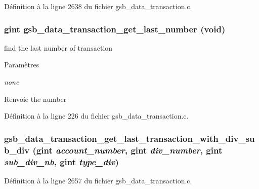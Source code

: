 Définition à la ligne 2638 du fichier gsb\_\-data\_\-transaction.c.

\subsubsection[{gsb\_\-data\_\-transaction\_\-get\_\-last\_\-number}]{\setlength{\rightskip}{0pt plus 5cm}gint gsb\_\-data\_\-transaction\_\-get\_\-last\_\-number (void)}\label{gsb__data__transaction_8c_ad5e10499d956a8613076bbd11fa8d376}
find the last number of transaction


\begin{DoxyParams}{Paramètres}
\item[{\em none}]\end{DoxyParams}
\begin{DoxyReturn}{Renvoie}
the number 
\end{DoxyReturn}


Définition à la ligne 226 du fichier gsb\_\-data\_\-transaction.c.

\subsubsection[{gsb\_\-data\_\-transaction\_\-get\_\-last\_\-transaction\_\-with\_\-div\_\-sub\_\-div}]{ gsb\_\-data\_\-transaction\_\-get\_\-last\_\-transaction\_\-with\_\-div\_\-sub\_\-div (gint {\em account\_\-number}, \/  gint {\em div\_\-number}, \/  gint {\em sub\_\-div\_\-nb}, \/  gint {\em type\_\-div})}\label{gsb__data__transaction_8c_a8fe058c05884ab1196d1b8b0286a1db9}


Définition à la ligne 2657 du fichier gsb\_\-data\_\-transaction.c.

